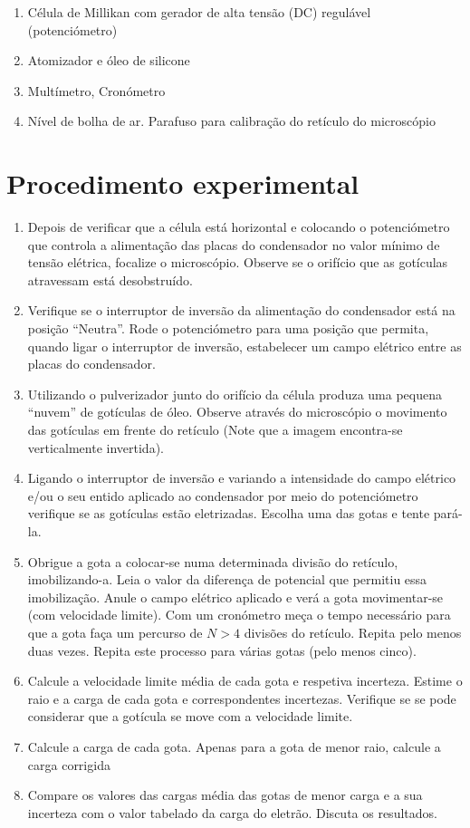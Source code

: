 \documentclass[a4paper,twoside,12pt]{article}      %
\begin{document}
\begin{enumerate}
	\item Célula de Millikan com gerador de alta tensão (DC) regulável (potenciómetro) 
	\item  Atomizador e óleo de silicone 
	\item Multímetro, Cronómetro 
	\item Nível de bolha de ar. Parafuso para calibração do retículo do microscópio
\end{enumerate}
\section{\sf Procedimento experimental}

\begin{enumerate}
\item   Depois de verificar que a célula está horizontal e colocando o potenciómetro que 
controla a alimentação das placas do condensador no valor mínimo de tensão elétrica,
focalize o microscópio. Observe se o orifício que as gotículas atravessam está 
desobstruído.
\item    Verifique se o interruptor de inversão da alimentação do condensador está na posição ``Neutra''.
Rode o potenciómetro para uma posição que permita, quando ligar o interruptor de inversão, estabelecer um campo elétrico entre as placas do condensador. 
\item     Utilizando o pulverizador junto do orifício da célula produza uma pequena ``nuvem'' %
de gotículas de óleo. Observe através do microscópio o movimento das gotículas em 
frente do retículo (Note que a imagem encontra-se verticalmente invertida).
\item     Ligando o interruptor de inversão e variando a intensidade do campo elétrico e/ou o seu entido aplicado ao condensador por meio do 
potenciómetro verifique se as gotículas estão eletrizadas. Escolha uma das gotas e tente pará-la.
 \item Obrigue a gota a colocar-se numa determinada divisão do retículo, imobilizando-a. 
Leia o valor da diferença de potencial que permitiu essa imobilização. Anule o 
campo elétrico aplicado e verá a gota movimentar-se (com velocidade limite). Com um 
cronómetro meça o tempo necessário para que a gota faça um percurso de $N>4$ divisões
do retículo. Repita pelo menos duas vezes. Repita este processo para várias gotas (pelo 
menos cinco). 
\item   Calcule a velocidade limite média de cada gota e respetiva incerteza. Estime o raio e 
a carga de cada gota e correspondentes incertezas. Verifique se se pode considerar 
que a gotícula se move com a velocidade limite.
\item Calcule a carga de cada gota. Apenas para a gota de menor raio, calcule a carga corrigida
\item   Compare os valores das cargas média das gotas de menor carga  e a sua incerteza com o valor  tabelado da carga do eletrão. Discuta os resultados.
\end{enumerate}



\end{document}
